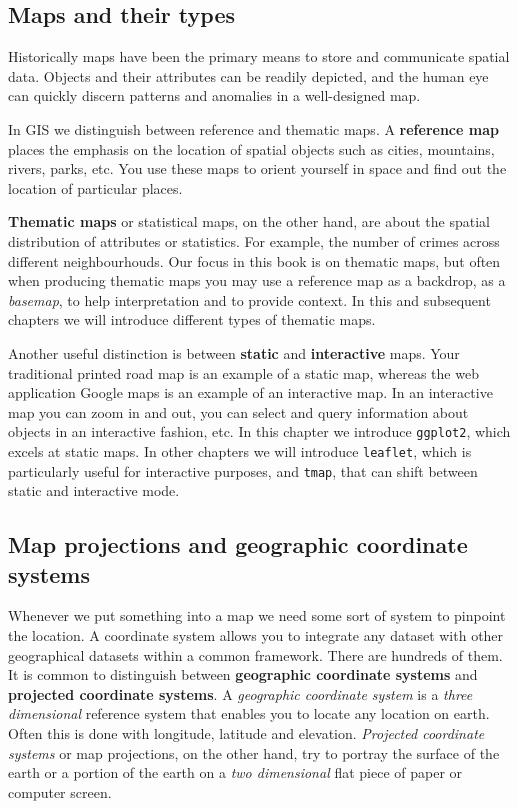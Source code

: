 \documentclass[
]{book}
\begin{document}
\hypertarget{maps-and-their-types}{%
\subsection{Maps and their types}\label{maps-and-their-types}}

Historically maps have been the primary means to store and communicate spatial data. Objects and their attributes can be readily depicted, and the human eye can quickly discern patterns and anomalies in a well-designed map.

In GIS we distinguish between reference and thematic maps. A \textbf{reference map} places the emphasis on the location of spatial objects such as cities, mountains, rivers, parks, etc. You use these maps to orient yourself in space and find out the location of particular places.

\textbf{Thematic maps} or statistical maps, on the other hand, are about the spatial distribution of attributes or statistics. For example, the number of crimes across different neighbourhouds. Our focus in this book is on thematic maps, but often when producing thematic maps you may use a reference map as a backdrop, as a \emph{basemap}, to help interpretation and to provide context. In this and subsequent chapters we will introduce different types of thematic maps.

Another useful distinction is between \textbf{static} and \textbf{interactive} maps. Your traditional printed road map is an example of a static map, whereas the web application Google maps is an example of an interactive map. In an interactive map you can zoom in and out, you can select and query information about objects in an interactive fashion, etc. In this chapter we introduce \texttt{ggplot2}, which excels at static maps. In other chapters we will introduce \texttt{leaflet}, which is particularly useful for interactive purposes, and \texttt{tmap}, that can shift between static and interactive mode.

\hypertarget{map-projections-and-geographic-coordinate-systems}{%
\subsection{Map projections and geographic coordinate systems}\label{map-projections-and-geographic-coordinate-systems}}

Whenever we put something into a map we need some sort of system to pinpoint the location. A coordinate system allows you to integrate any dataset with other geographical datasets within a common framework. There are hundreds of them. It is common to distinguish between \textbf{geographic coordinate systems} and \textbf{projected coordinate systems}. A \emph{geographic coordinate system} is a \emph{three dimensional} reference system that enables you to locate any location on earth. Often this is done with longitude, latitude and elevation. \emph{Projected coordinate systems} or map projections, on the other hand, try to portray the surface of the earth or a portion of the earth on a \emph{two dimensional} flat piece of paper or computer screen.
\end{document}
